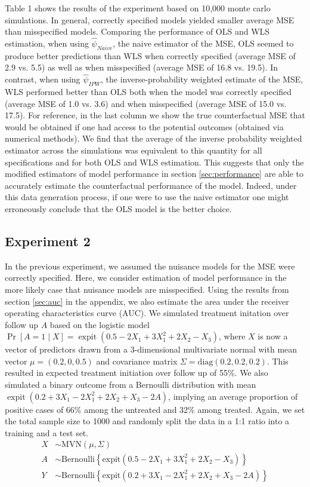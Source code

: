 Table 1 shows the results of the experiment based on 10,000 monte carlo simulations. In general, correctly specified models yielded smaller average MSE than misspecified models. Comparing the performance of OLS and WLS estimation, when using $\widehat{\psi}_{Naive}$, the naive estimator of the MSE, OLS seemed to produce better predictions than WLS when correctly specified (average MSE of 2.9 vs. 5.5) as well as when misspecified (average MSE of 16.8 vs. 19.5). In contrast, when using $\widehat{\psi}_{IPW}$, the inverse-probability weighted estimate of the MSE, WLS performed better than OLS both when the model was correctly specified (average MSE of 1.0 vs. 3.6) and when misspecified (average MSE of 15.0 vs. 17.5). For reference, in the last column we show the true counterfactual MSE that would be obtained if one had access to the potential outcomes (obtained via numerical methods). We find that the average of the inverse probability weighted estimator across the simulations was equivalent to this quantity for all specifications and for both OLS and WLS estimation. This suggests that only the modified estimators of model performance in section \ref{sec:performance} are able to accurately estimate the counterfactual performance of the model. Indeed, under this data generation process, if one were to use the naive estimator one might erroneously conclude that the OLS model is the better choice.


\subsection{Experiment 2}

In the previous experiment, we assumed the nuisance models for the MSE were correctly specified. Here, we consider estimation of model performance in the more likely case that nuisance models are misspecified. Using the results from section \ref{sec:auc} in the appendix, we also estimate the area under the receiver operating characteristics curve (AUC). We simulated treatment initation over follow up $A$ based on the logistic model $\operatorname{Pr}[A=1 \mid X]=\operatorname{expit}(0.5 - 2 X_1 + 3 X_1^2 + 2 X_2 - X_3)$, where $X$ is now a vector of predictors drawn from a 3-dimensional multivariate normal with mean vector $\mu = (0.2, 0, 0.5)$ and covariance matrix $\Sigma = \text{diag}(0.2, 0.2, 0.2)$. This resulted in expected treatment initiation over follow up of 55\%. We also simulated a binary outcome from a Bernoulli distribution with mean $\operatorname{expit}(0.2 + 3 X_1 - 2 X_1^2 + 2 X_2 + X_3 - 2 A)$, implying an average proportion of positive cases of 66\% among the untreated and 32\% among treated. Again, we set the total sample size to 1000 and randomly split the data in a 1:1 ratio into a training and a test set. 
\begin{align*}
    X & \sim \text{MVN}(\mu, \Sigma) \\
    A & \sim \text{Bernoulli}\left\{\text{expit}\left(0.5 - 2 X_1 + 3 X_1^2 + 2 X_2 - X_3\right)\right\} \\
    Y & \sim \text{Bernoulli}\left\{\text{expit}\left(0.2 + 3 X_1 - 2 X_1^2 + 2 X_2 + X_3 - 2 A\right)\right\}
\end{align*}

